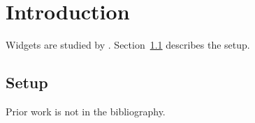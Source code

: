 \chapter{Introduction}
\label{ch:intro}
Widgets are studied by \citet{doe2021}.
Section~\ref{sec:setup} describes the setup.
\section{Setup}
\label{sec:setup}
Prior work \citep{nosuchkey} is not in the bibliography.
